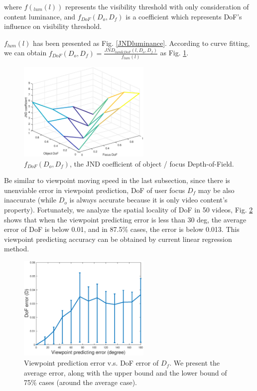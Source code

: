 where $f(_{lum}(l))$ represents the visibility threshold with only consideration of content luminance, and $f_{DoF}(D_o, D_f)$ is a coefficient which represents DoF's influence on visibility threshold.

$f_{lum}(l)$ has been presented as Fig. \ref{JNDluminance}. According to curve fitting, we can obtain $f_{DoF}(D_o, D_f) = \frac{JND_{lum\&DoF}(l, D_o, D_f)}{f_{lum}(l)}$ as Fig. \ref{JNDdof}.

\begin{figure}
  \centering
  \includegraphics[width=2.5in]{images/JNDdof.eps}
  \caption{$f_{DoF}(D_o, D_f)$, the JND coefficient of object / focus Depth-of-Field.}
  \label{JNDdof}
  \end{figure}

Be similar to viewpoint moving speed in the last subsection, since there is unenviable error in viewpoint prediction, DoF of user focus $D_f$ may be also inaccurate (while $D_o$ is always accurate because it is only video content's property). Fortunately, we analyze the spatial locality of DoF in 50 videos, Fig. \ref{depth_analysis} shows that when the viewpoint predicting error is less than 30 deg, the average error of DoF is below 0.01, and in 87.5\% cases, the error is below 0.013. This viewpoint predicting accuracy can be obtained by current linear regression method.

\begin{figure}
  \centering
  \includegraphics[width=2.5in]{images/depth_analysis.eps}
  \caption{Viewpoint prediction error v.s. DoF error of $D_f$. We present the average error, along with the upper bound and the lower bound of 75\% cases (around the average case).}
  \label{depth_analysis}
  \end{figure}

